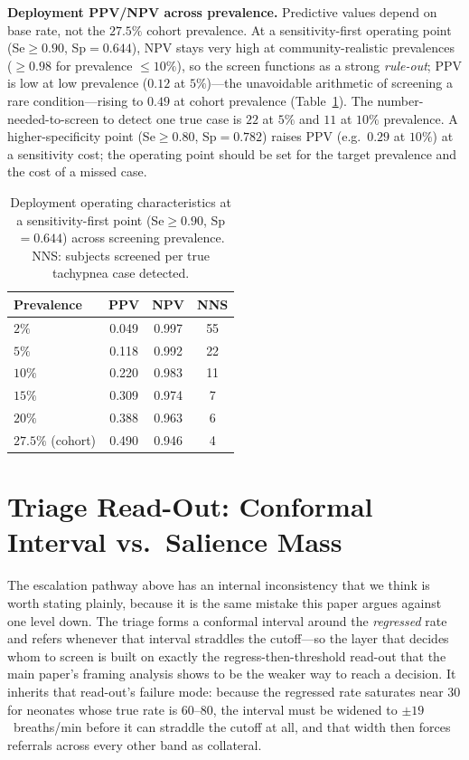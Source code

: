 \textbf{Deployment PPV/NPV across prevalence.} Predictive values depend on base rate, not the $27.5\%$
cohort prevalence. At a sensitivity-first operating point (Se${\ge}0.90$, Sp${=}0.644$), NPV stays very high
at community-realistic prevalences ($\ge0.98$ for prevalence ${\le}10\%$), so the screen functions as a
strong \emph{rule-out}; PPV is low at low prevalence ($0.12$ at $5\%$)---the unavoidable arithmetic of
screening a rare condition---rising to $0.49$ at cohort prevalence (Table~\ref{tab:ppv}). The
number-needed-to-screen to detect one true case is $22$ at $5\%$ and $11$ at $10\%$ prevalence. A
higher-specificity point (Se${\ge}0.80$, Sp${=}0.782$) raises PPV (e.g.\ $0.29$ at $10\%$) at a sensitivity
cost; the operating point should be set for the target prevalence and the cost of a missed case.

\begin{table}[!t]\caption{Deployment operating characteristics at a sensitivity-first point (Se${\ge}0.90$,
Sp${=}0.644$) across screening prevalence. NNS: subjects screened per true tachypnea case
detected.}\label{tab:ppv}\centering\small
\begin{tabular}{@{}lccc@{}}\toprule
Prevalence & PPV & NPV & NNS\\\midrule
$2\%$ & 0.049 & 0.997 & 55\\
$5\%$ & 0.118 & 0.992 & 22\\
$10\%$ & 0.220 & 0.983 & 11\\
$15\%$ & 0.309 & 0.974 & 7\\
$20\%$ & 0.388 & 0.963 & 6\\
$27.5\%$ (cohort) & 0.490 & 0.946 & 4\\\bottomrule
\end{tabular}\end{table}


\section{Triage Read-Out: Conformal Interval vs.\ Salience Mass}
\label{sec:disttriage}
The escalation pathway above has an internal inconsistency that we think is worth stating plainly,
because it is the same mistake this paper argues against one level down. The triage forms a conformal
interval around the \emph{regressed} rate and refers whenever that interval straddles the cutoff---so
the layer that decides whom to screen is built on exactly the regress-then-threshold read-out that
the main paper's framing analysis shows to be the weaker way to reach a decision. It inherits
that read-out's
failure mode: because the regressed rate saturates near $30$ for neonates whose true rate is $60$--$80$,
the interval must be widened to $\pm19$~breaths/min before it can straddle the cutoff at all, and that
width then forces referrals across every other band as collateral.

